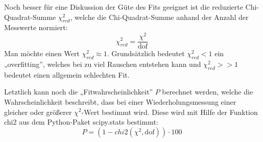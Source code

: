 Noch besser für eine Diskussion der Güte des Fits geeignet ist die reduzierte Chi-Quadrat-Summe $\chi^2_{red}$, welche die Chi-Quadrat-Summe anhand der Anzahl der Messwerte normiert:
\begin{equation}
    \chi^2_{red} = \frac{\chi^2}{\text{dof}}~\label{eq:chisquare_red}
\end{equation}
Man möchte einen Wert $\chi^2_{red} \approx 1$. Grundsätzlich bedeutet $\chi^2_{red} < 1$ ein „overfitting”, welches bei zu viel Rauschen entstehen kann und $\chi^2_{red} >> 1$ bedeutet einen allgemein schlechten Fit.

Letztlich kann noch die „Fitwahrscheinlichkeit” $P$ berechnet werden, welche die Wahrscheinlichkeit beschreibt, dass bei einer Wiederholungsmessung einer gleicher oder größerer $\chi^2$-Wert bestimmt wird. Diese wird mit Hilfe der Funktion chi2 aus dem Python-Paket scipy.stats bestimmt:
\begin{equation}
    P = (1 - chi2(\chi^2, \text{dof})) \cdot 100~\label{eq:fitwahrscheinkichkeit}
\end{equation} 